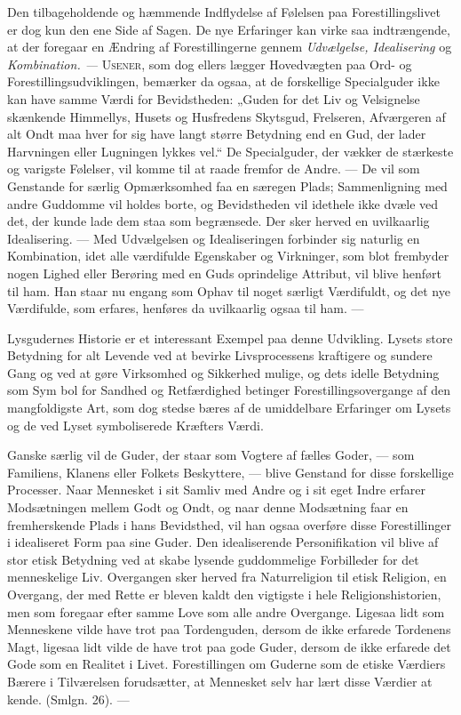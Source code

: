 \documentclass[12pt,a4paper,openany]{book}
\newcommand{\opage}[1]{\marginnote{\footnotesize\textit{[#1]}}}
\begin{document}
Den tilbageholdende og hæmmende Indflydelse af Følelsen paa
Forestillingslivet er dog kun den ene Side af Sagen. De nye Erfaringer
kan virke saa indtrængende, at der foregaar en Ændring af
Forestillingerne gennem \textit{Udvælgelse, Idealisering} og
\textit{Kombination. ---} \textsc{Usener}, som dog ellers lægger
Hovedvægten paa Ord- og Forestillingsudviklingen, bemærker da ogsaa, at
de forskellige Specialguder ikke kan have samme Værdi for Bevidstheden:
„Guden for det Liv og Velsignelse skænkende Himmellys, Husets og
Husfredens Skytsgud, Frelseren, Afværgeren af alt Ondt maa hver for sig
have langt større Betydning end en Gud, der lader Harvningen eller
Lugningen lykkes vel.“ De Specialguder, der vækker de stærkeste og
varigste Følelser, vil komme til at raade fremfor de Andre. --- De vil
som Genstande for særlig Opmærksomhed faa en særegen Plads;
Sammenligning med andre Guddomme vil holdes borte, og Bevidstheden vil
idethele ikke dvæle ved det, der kunde lade dem staa som begrænsede. Der
sker herved en uvilkaarlig Idealisering. --- Med Udvælgelsen og
Idealiseringen forbinder sig naturlig en Kombination, idet alle
værdifulde Egenskaber og Virkninger, som blot frembyder nogen Lighed
eller Berøring med en Guds oprindelige Attribut, vil blive henført til
ham. Han staar nu engang som Ophav til noget særligt Værdifuldt, og det
nye Værdifulde, som erfares, henføres da uvilkaarlig ogsaa til ham. ---

Lysgudernes Historie er et interessant Exempel paa denne Udvikling.
Lysets store Betydning for alt Levende ved at bevirke Livsprocessens
kraftigere og sundere Gang og ved at gøre Virksomhed og Sikkerhed
mulige, og dets idelle Betydning som Sym%
\opage{97}bol for Sandhed og Retfærdighed betinger
Forestillingsovergange af den mangfoldigste Art, som dog stedse bæres af
de umiddelbare Erfaringer om Lysets og de ved Lyset symboliserede
Kræfters Værdi.

Ganske særlig vil de Guder, der staar som Vogtere af fælles Goder, ---
som Familiens, Klanens eller Folkets Beskyttere, --- blive Genstand for
disse forskellige Processer. Naar Mennesket i sit Samliv med Andre og i
sit eget Indre erfarer Modsætningen mellem Godt og Ondt, og naar denne
Modsætning faar en fremherskende Plads i hans Bevidsthed, vil han ogsaa
overføre disse Forestillinger i idealiseret Form paa sine Guder. Den
idealiserende Personifikation vil blive af stor etisk Betydning ved at
skabe lysende guddommelige Forbilleder for det menneskelige Liv.
Overgangen sker herved fra Naturreligion til etisk Religion, en
Overgang, der med Rette er bleven kaldt den vigtigste i hele
Religionshistorien, men som foregaar efter samme Love som alle andre
Overgange. Ligesaa lidt som Menneskene vilde have trot paa Tordenguden,
dersom de ikke erfarede Tordenens Magt, ligesaa lidt vilde de have trot
paa gode Guder, dersom de ikke erfarede det Gode som en Realitet i
Livet. Forestillingen om Guderne som de etiske Værdiers Bærere i
Tilværelsen forudsætter, at Mennesket selv har lært disse Værdier at
kende. (Smlgn. 26). ---
\end{document}
